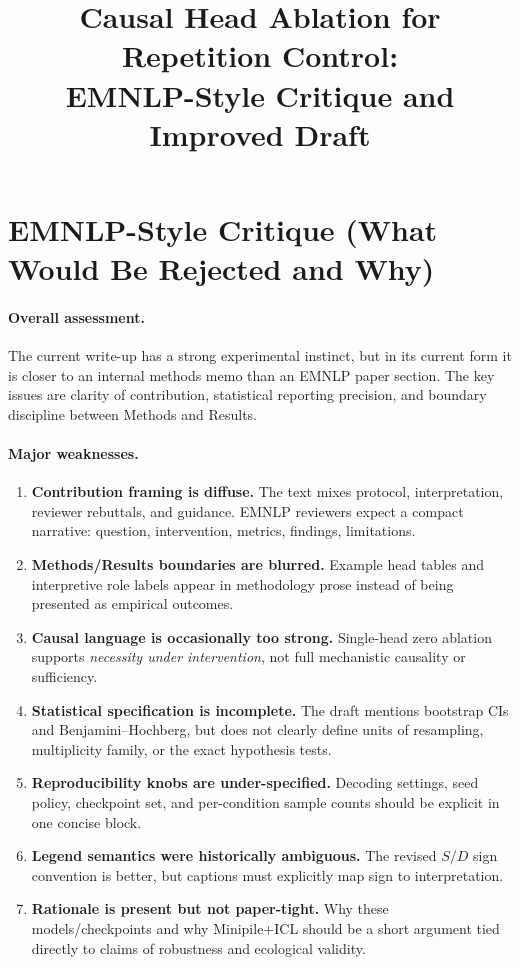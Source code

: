 \documentclass[11pt]{article}
\title{Causal Head Ablation for Repetition Control:\\EMNLP-Style Critique and Improved Draft}
\author{}
\date{}
\begin{document}
\maketitle

\section{EMNLP-Style Critique (What Would Be Rejected and Why)}

\paragraph{Overall assessment.}
The current write-up has a strong experimental instinct, but in its current form it is closer to an internal methods memo than an EMNLP paper section. The key issues are clarity of contribution, statistical reporting precision, and boundary discipline between Methods and Results.

\paragraph{Major weaknesses.}
\begin{enumerate}[leftmargin=*]
    \item \textbf{Contribution framing is diffuse.} The text mixes protocol, interpretation, reviewer rebuttals, and guidance. EMNLP reviewers expect a compact narrative: question, intervention, metrics, findings, limitations.
    \item \textbf{Methods/Results boundaries are blurred.} Example head tables and interpretive role labels appear in methodology prose instead of being presented as empirical outcomes.
    \item \textbf{Causal language is occasionally too strong.} Single-head zero ablation supports \emph{necessity under intervention}, not full mechanistic causality or sufficiency.
    \item \textbf{Statistical specification is incomplete.} The draft mentions bootstrap CIs and Benjamini--Hochberg, but does not clearly define units of resampling, multiplicity family, or the exact hypothesis tests.
    \item \textbf{Reproducibility knobs are under-specified.} Decoding settings, seed policy, checkpoint set, and per-condition sample counts should be explicit in one concise block.
    \item \textbf{Legend semantics were historically ambiguous.} The revised $S/D$ sign convention is better, but captions must explicitly map sign to interpretation.
    \item \textbf{Rationale is present but not paper-tight.} Why these models/checkpoints and why Minipile+ICL should be a short argument tied directly to claims of robustness and ecological validity.
\end{enumerate}
\end{document}
